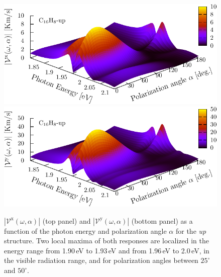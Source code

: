\documentclass[prb,11pt,tightenlines,twocolumn,aps]{revtex4-1}
\begin{document}
\begin{figure}[t]
    \centering
    \includegraphics[width=\linewidth]{upplots/up-3d-vxb-2}
    \\
    \includegraphics[width=\linewidth]{upplots/up-3d-vyb-2}
    
    \caption{$|\mathcal{V}^{\mathrm{x}}(\omega,\alpha)|$ (top panel) and
    $|\mathcal{V}^{\mathrm{y}}(\omega,\alpha)|$ (bottom panel)  as a function
    of the photon energy and polarization angle $\alpha$ for the \emph{up}
    structure. Two local maxima of both responses are localized in the energy
    range from 1.90\,eV to 1.93\,eV and from 1.96\,eV to 2.0\,eV, in the
    visible radiation range, and for polarization angles between $25^{\circ}$
    and $50^{\circ}$.}
    \label{fig:up-3d-vva-2}
\end{figure}
\end{document}
